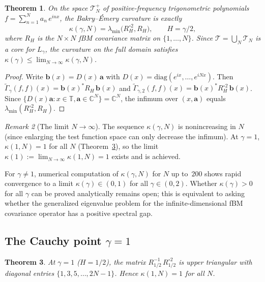 \documentclass[11pt,a4paper]{article}
\theoremstyle{plain}
\newtheorem{theorem}{Theorem}[section]
\theoremstyle{definition}
\theoremstyle{remark}
\newtheorem{remark}[theorem]{Remark}
\newcommand{\C}{\mathbb{C}}
\newcommand{\T}{\mathbb{T}}
\begin{document}
\begin{theorem}\label{thm:curvature}
On the space $\mathcal{T}_N^+$ of positive-frequency trigonometric
polynomials $f = \sum_{n=1}^N a_n\,e^{inx}$, the Bakry--\'Emery
curvature is exactly
\begin{equation}\label{eq:kappa-def}
  \kappa(\gamma,N) = \lambda_{\min}\!\bigl(R_H^{\circ 2}, R_H\bigr),
  \qquad H = \gamma/2,
\end{equation}
where $R_H$ is the $N \times N$ fBM covariance matrix on $\{1,\ldots,N\}$.
Since $\mathcal{T} = \bigcup_N \mathcal{T}_N$ is a core for $L_\gamma$,
the curvature on the full domain satisfies
$\kappa(\gamma) \leq \lim_{N\to\infty} \kappa(\gamma,N)$.
\end{theorem}

\begin{proof}
Write $\mathbf{b}(x) = D(x)\,\mathbf{a}$ with
$D(x) = \mathrm{diag}(e^{ix},\ldots,e^{iNx})$. Then
$\widetilde{\Gamma}_\gamma(f,f)(x) = \mathbf{b}(x)^* R_H\,\mathbf{b}(x)$
and $\widetilde{\Gamma}_{\gamma,2}(f,f)(x) =
\mathbf{b}(x)^* R_H^{\circ 2}\,\mathbf{b}(x)$.
Since $\{D(x)\mathbf{a} : x \in \T, \mathbf{a} \in \C^N\} = \C^N$,
the infimum over $(x,\mathbf{a})$ equals
$\lambda_{\min}(R_H^{\circ 2}, R_H)$.
\end{proof}

\begin{remark}[The limit $N \to \infty$]
\label{rem:N-limit}
The sequence $\kappa(\gamma,N)$ is nonincreasing in $N$
(since enlarging the test function space can only decrease
the infimum).  At $\gamma = 1$, $\kappa(1,N) = 1$ for all
$N$ (Theorem~\ref{thm:cauchy}), so the limit
$\kappa(1) := \lim_{N\to\infty}\kappa(1,N) = 1$ exists
and is achieved.

For $\gamma \neq 1$, numerical computation of $\kappa(\gamma,N)$
for $N$ up to~$200$ shows rapid convergence to a limit
$\kappa(\gamma) \in (0,1)$ for all $\gamma \in (0,2)$.
Whether $\kappa(\gamma) > 0$ for all $\gamma$ can be proved
analytically remains open; this is equivalent to asking
whether the generalized eigenvalue problem for the
infinite-dimensional fBM covariance operator has a positive
spectral gap.
\end{remark}


\subsection{The Cauchy point $\gamma = 1$}\label{sec:cauchy}

\begin{theorem}\label{thm:cauchy}
At $\gamma = 1$ ($H = 1/2$), the matrix $R_{1/2}^{-1}\,R_{1/2}^{\circ 2}$
is upper triangular with diagonal entries $\{1, 3, 5, \ldots, 2N-1\}$.
Hence $\kappa(1,N) = 1$ for all $N$.
\end{theorem}
\end{document}

